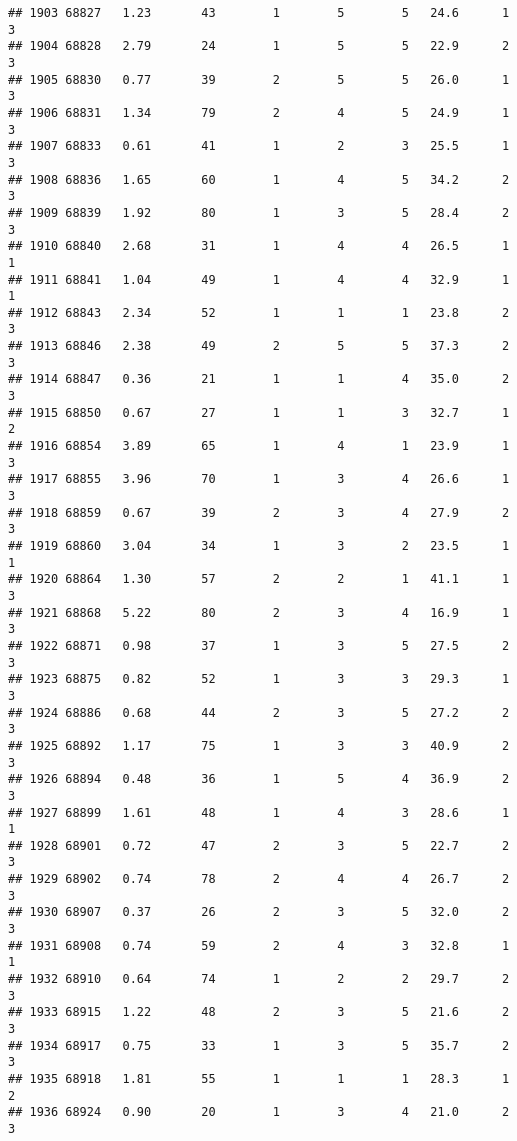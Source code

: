 \documentclass[
]{article}
\begin{document}
\begin{verbatim}
## 1903 68827   1.23       43        1        5        5   24.6      1      3
## 1904 68828   2.79       24        1        5        5   22.9      2      3
## 1905 68830   0.77       39        2        5        5   26.0      1      3
## 1906 68831   1.34       79        2        4        5   24.9      1      3
## 1907 68833   0.61       41        1        2        3   25.5      1      3
## 1908 68836   1.65       60        1        4        5   34.2      2      3
## 1909 68839   1.92       80        1        3        5   28.4      2      3
## 1910 68840   2.68       31        1        4        4   26.5      1      1
## 1911 68841   1.04       49        1        4        4   32.9      1      1
## 1912 68843   2.34       52        1        1        1   23.8      2      3
## 1913 68846   2.38       49        2        5        5   37.3      2      3
## 1914 68847   0.36       21        1        1        4   35.0      2      3
## 1915 68850   0.67       27        1        1        3   32.7      1      2
## 1916 68854   3.89       65        1        4        1   23.9      1      3
## 1917 68855   3.96       70        1        3        4   26.6      1      3
## 1918 68859   0.67       39        2        3        4   27.9      2      3
## 1919 68860   3.04       34        1        3        2   23.5      1      1
## 1920 68864   1.30       57        2        2        1   41.1      1      3
## 1921 68868   5.22       80        2        3        4   16.9      1      3
## 1922 68871   0.98       37        1        3        5   27.5      2      3
## 1923 68875   0.82       52        1        3        3   29.3      1      3
## 1924 68886   0.68       44        2        3        5   27.2      2      3
## 1925 68892   1.17       75        1        3        3   40.9      2      3
## 1926 68894   0.48       36        1        5        4   36.9      2      3
## 1927 68899   1.61       48        1        4        3   28.6      1      1
## 1928 68901   0.72       47        2        3        5   22.7      2      3
## 1929 68902   0.74       78        2        4        4   26.7      2      3
## 1930 68907   0.37       26        2        3        5   32.0      2      3
## 1931 68908   0.74       59        2        4        3   32.8      1      1
## 1932 68910   0.64       74        1        2        2   29.7      2      3
## 1933 68915   1.22       48        2        3        5   21.6      2      3
## 1934 68917   0.75       33        1        3        5   35.7      2      3
## 1935 68918   1.81       55        1        1        1   28.3      1      2
## 1936 68924   0.90       20        1        3        4   21.0      2      3

\end{verbatim}
\end{document}
